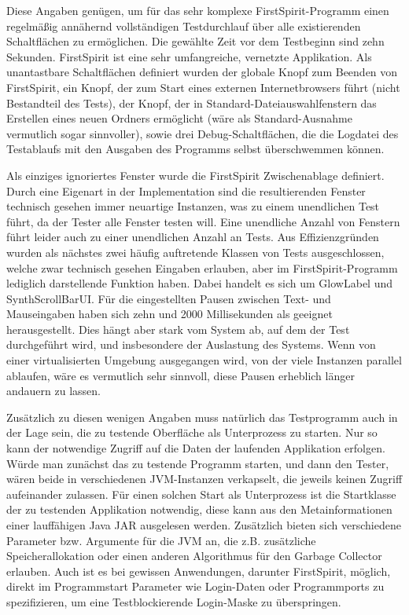 Diese Angaben genügen, um für das sehr komplexe FirstSpirit-Programm einen regelmäßig annähernd
vollständigen Testdurchlauf über alle existierenden Schaltflächen zu ermöglichen.
Die gewählte Zeit vor dem Testbeginn sind zehn Sekunden. FirstSpirit ist eine sehr umfangreiche,
vernetzte Applikation. Als unantastbare Schaltflächen definiert wurden der globale Knopf
zum Beenden von FirstSpirit, ein Knopf, der zum Start eines externen Internetbrowsers führt
(nicht Bestandteil des Tests), der Knopf, der in Standard-Dateiauswahlfenstern das Erstellen eines neuen
Ordners ermöglicht (wäre als Standard-Ausnahme vermutlich sogar sinnvoller), sowie drei
Debug-Schaltflächen, die die Logdatei des Testablaufs mit den Ausgaben des Programms selbst
überschwemmen können.

Als einziges ignoriertes Fenster wurde die \glqq{}FirstSpirit Zwischenablage\grqq{} definiert. Durch eine
Eigenart in der Implementation sind die resultierenden Fenster technisch gesehen immer neuartige
Instanzen, was zu einem unendlichen Test führt, da der Tester alle Fenster testen will.
Eine unendliche Anzahl von Fenstern führt leider auch zu einer unendlichen Anzahl an Tests.
Aus Effizienzgründen wurden als nächstes zwei häufig auftretende Klassen von Tests ausgeschlossen,
welche zwar technisch gesehen Eingaben erlauben, aber im FirstSpirit-Programm lediglich
darstellende Funktion haben. Dabei handelt es sich um \glqq{}GlowLabel\grqq{} und \glqq{}SynthScrollBarUI\grqq{}.
Für die eingestellten Pausen zwischen Text- und Mauseingaben haben sich zehn und 2000 Millisekunden
als geeignet herausgestellt. Dies hängt aber stark vom System ab, auf dem der Test durchgeführt wird,
und insbesondere der Auslastung des Systems. Wenn von einer virtualisierten Umgebung ausgegangen
wird, von der viele Instanzen parallel ablaufen, wäre es vermutlich sehr sinnvoll, diese
Pausen erheblich länger andauern zu lassen.

Zusätzlich zu diesen wenigen Angaben muss natürlich das Testprogramm auch in der Lage sein,
die zu testende Oberfläche als Unterprozess zu starten. Nur so kann der notwendige Zugriff
auf die Daten der laufenden Applikation erfolgen. Würde man zunächst das zu testende
Programm starten, und dann den Tester, wären beide in verschiedenen JVM-Instanzen
verkapselt, die jeweils keinen Zugriff aufeinander zulassen. Für einen solchen
Start als Unterprozess ist die Startklasse der zu testenden Applikation notwendig,
diese kann aus den Metainformationen einer lauffähigen Java \glqq{}JAR\grqq{}
ausgelesen werden. Zusätzlich bieten sich verschiedene Parameter bzw. Argumente
für die JVM an, die z.B. zusätzliche Speicherallokation oder einen anderen
Algorithmus für den Garbage Collector erlauben. Auch ist es bei gewissen Anwendungen,
darunter FirstSpirit, möglich, direkt im Programmstart Parameter wie Login-Daten
oder Programmports zu spezifizieren, um eine Testblockierende Login-Maske
zu überspringen.

